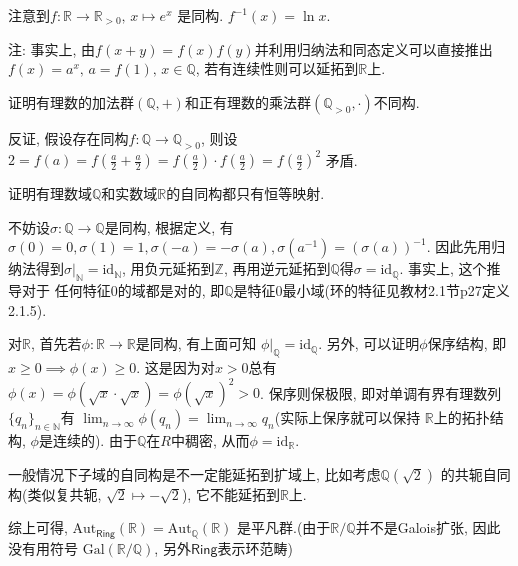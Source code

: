 \begin{solution}
    注意到$f: \mathbb{R} \to \mathbb{R}_{>0},\, x \mapsto e^x$
是同构. $f^{-1}(x) = \ln x$.

注: 事实上, 由$f(x + y) = f(x)f(y)$并利用归纳法和同态定义可以直接推出
$f(x) = a^x,\, a = f(1),\, x \in \mathbb{Q}$, 若有连续性则可以延拓到$\mathbb{R}$上.
\end{solution}

\begin{problem}
    证明有理数的加法群$(\mathbb{Q}, +)$和正有理数的乘法群$(\mathbb{Q}_{>0}, \cdot)$不同构.
\end{problem}

\begin{solution}
    反证, 假设存在同构$f: \mathbb{Q} \to \mathbb{Q}_{>0}$,
则设$2 = f(a) = f(\frac{a}{2} + \frac{a}{2}) = f(\frac{a}{2}) \cdot f(\frac{a}{2}) = f(\frac{a}{2})^2$
矛盾.
\end{solution}

\begin{problem}
    证明有理数域$\mathbb{Q}$和实数域$\mathbb{R}$的自同构都只有恒等映射.
\end{problem}

\begin{solution}
    不妨设$\sigma: \mathbb{Q} \to \mathbb{Q}$是同构, 根据定义,
有$\sigma(0) = 0, \sigma(1) = 1, \sigma(-a) = -\sigma(a), \sigma(a^{-1}) = (\sigma(a))^{-1}$.
因此先用归纳法得到$\sigma|_{\mathbb{N}} = \mathrm{id}_{\mathbb{N}}$, 用负元延拓到$\mathbb{Z}$,
再用逆元延拓到$\mathbb{Q}$得$\sigma = \mathrm{id}_{\mathbb{Q}}$. 事实上, 这个推导对于
任何特征$0$的域都是对的, 即$\mathbb{Q}$是特征$0$最小域(环的特征见教材2.1节p27定义2.1.5).

    对$\mathbb{R}$, 首先若$\phi: \mathbb{R} \to \mathbb{R}$是同构, 有上面可知
$\phi|_{\mathbb{Q}} = \mathrm{id}_{\mathbb{Q}}$. 另外, 可以证明$\phi$保序结构,
即$x \geqslant 0 \implies \phi(x) \geqslant 0$. 这是因为对$x > 0$总有
$\phi(x) = \phi(\sqrt{x} \cdot \sqrt{x}) = \phi(\sqrt{x})^2 > 0$. 保序则保极限,
即对单调有界有理数列$\{q_n\}_{n \in \mathbb{N}}$有
$\lim_{n \to \infty} \phi(q_n) = \lim_{n \to \infty} q_n$(实际上保序就可以保持
$\mathbb{R}$上的拓扑结构, $\phi$是连续的). 由于$\mathbb{Q}$在$R$中稠密,
从而$\phi = \mathrm{id}_{\mathbb{R}}$.

    一般情况下子域的自同构是不一定能延拓到扩域上, 比如考虑$\mathbb{Q}(\sqrt{2})$
的共轭自同构(类似复共轭, $\sqrt{2} \mapsto -\sqrt{2}$), 它不能延拓到$\mathbb{R}$上.

    综上可得,
$\mathrm{Aut}_{\mathsf{Ring}}(\mathbb{R}) = \mathrm{Aut}_{\mathbb{Q}}(\mathbb{R})$
是平凡群.(由于$\mathbb{R}/\mathbb{Q}$并不是Galois扩张, 因此没有用符号
$\mathrm{Gal}(\mathbb{R}/\mathbb{Q})$, 另外$\mathsf{Ring}$表示环范畴)
\end{solution}

